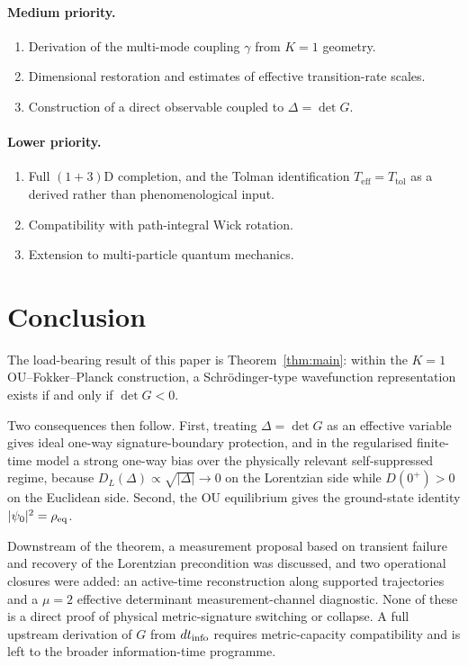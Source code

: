 \documentclass[11pt,a4paper]{article}
\theoremstyle{definition}
\begin{document}
\paragraph{Medium priority.}
\begin{enumerate}
\item Derivation of the multi-mode coupling $\gamma$ from $K{=}1$
geometry.
\item Dimensional restoration and estimates of effective transition-rate
scales.
\item Construction of a direct observable coupled to $\Delta=\det G$.
\end{enumerate}

\paragraph{Lower priority.}
\begin{enumerate}
\item Full $(1{+}3)$D completion, and the Tolman identification
$T_{\mathrm{eff}}=T_{\mathrm{tol}}$ as a derived rather than
phenomenological input.
\item Compatibility with path-integral Wick rotation.
\item Extension to multi-particle quantum mechanics.
\end{enumerate}

\section{Conclusion}\label{sec:conclusion}

The load-bearing result of this paper is Theorem~\ref{thm:main}:
within the $K{=}1$ OU--Fokker--Planck construction, a
Schr\"odinger-type wavefunction representation exists if and only if
$\det G<0$.

Two consequences then follow. First, treating
$\Delta=\det G$ as an effective variable gives ideal one-way
signature-boundary protection, and in the regularised finite-time model a
strong one-way bias over the physically relevant self-suppressed regime,
because $D_L(\Delta)\propto\sqrt{|\Delta|}\to0$ on the Lorentzian side while
$D(0^+)>0$ on the Euclidean side. Second, the OU equilibrium gives the
ground-state identity $|\psi_0|^2=\rho_{\rm eq}$.

Downstream of the theorem, a measurement proposal based on transient
failure and recovery of the Lorentzian precondition was discussed, and two
operational closures were added: an active-time reconstruction along
supported trajectories and a $\mu=2$ effective determinant measurement-channel
diagnostic. None of these is a direct proof of physical metric-signature
switching or collapse. A full upstream derivation of $G$ from
$dt_{\rm info}$ requires metric-capacity compatibility and is left to the
broader information-time programme.
\end{document}
